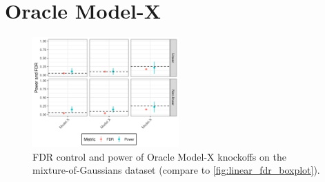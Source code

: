 \documentclass{article}
\newcommand{\FlowSelect}{\textsc{FlowSelect}\xspace}
\begin{document}





\section{Oracle Model-X}\label{sec:oracle-model-x}

\begin{figure}[!h]
    \centering
    \includegraphics[width=0.5\textwidth]{./fig/gaussian_ar_mixture_d100_n100000_rho0.98__modelx_meanplots.png}
    \caption{FDR control and power of Oracle Model-X knockoffs on the mixture-of-Gaussians dataset (compare to \cref{fig:linear_fdr_boxplot}).
    }
    \label{fig:oracle_modelx_boxplots}
\end{figure}
\end{document}

